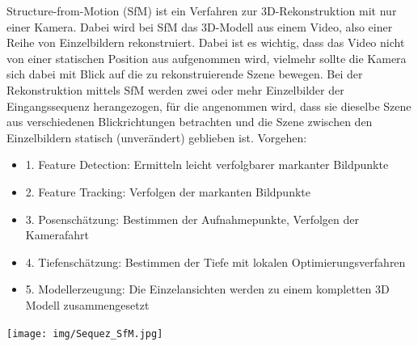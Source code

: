 Structure-from-Motion (SfM) ist ein Verfahren zur 3D-Rekonstruktion mit nur einer Kamera. Dabei wird bei SfM das 3D-Modell aus einem Video, also einer Reihe von Einzelbildern rekonstruiert. Dabei ist es wichtig, dass das Video nicht von einer statischen Position aus aufgenommen wird, vielmehr sollte die Kamera sich dabei mit Blick auf die zu rekonstruierende Szene bewegen. Bei der Rekonstruktion mittels SfM werden zwei oder mehr Einzelbilder der Eingangssequenz herangezogen, für die angenommen wird, dass sie dieselbe Szene aus verschiedenen Blickrichtungen betrachten und die Szene zwischen den Einzelbildern statisch (unverändert) geblieben ist.
Vorgehen:
\begin{itemize}
\item 1. Feature Detection: Ermitteln leicht verfolgbarer markanter Bildpunkte\item 2. Feature Tracking: Verfolgen der markanten Bildpunkte\item 3. Posenschätzung: Bestimmen der Aufnahmepunkte, Verfolgen der Kamerafahrt\item 4. Tiefenschätzung: Bestimmen der Tiefe mit lokalen Optimierungsverfahren\item 5. Modellerzeugung: Die Einzelansichten werden zu einem kompletten 3D Modell zusammengesetzt
\end{itemize}
\texttt{[image: img/Sequez\_SfM.jpg]} 